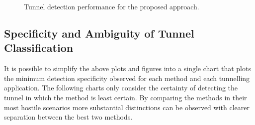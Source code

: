 \documentclass{llncs}
\begin{document}
\begin{figure}
\centering
{}
\caption{Tunnel detection performance for the proposed approach.}
\end{figure}


\subsection{Specificity and Ambiguity of Tunnel Classification}
\label{detection-perf-cert}

It is possible to simplify the above plots and figures into a single chart that
plots the minimum detection specificity observed for each method and each
tunnelling application. The following charts only consider the certainty of
detecting the tunnel in which the method is least certain. By comparing the
methods in their most hostile scenarios more substantial distinctions can be
observed with clearer separation between the best two methods.
\end{document}
